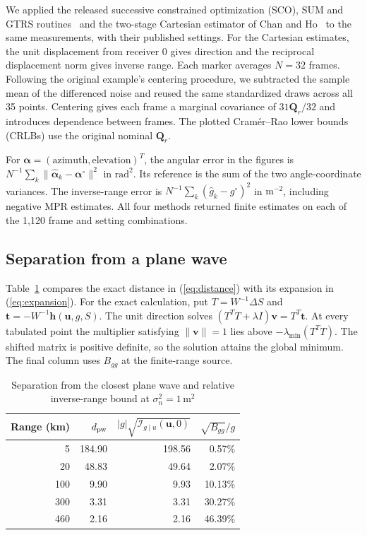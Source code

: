 \documentclass[journal]{IEEEtran}
\newcommand{\bu}{\mathbf{u}}
\newcommand{\bh}{\mathbf{h}}
\newcommand{\bQ}{\mathbf{Q}}
\begin{document}
We applied the released successive constrained optimization (SCO), SUM and GTRS routines~\cite{sunho2019,suniot2022,cispcode} and the two-stage Cartesian estimator of Chan and Ho~\cite{chanho1994,cispcode} to the same measurements, with their published settings. For the Cartesian estimates, the unit displacement from receiver 0 gives direction and the reciprocal displacement norm gives inverse range. Each marker averages \(N=32\) frames. Following the original example's centering procedure, we subtracted the sample mean of the differenced noise and reused the same standardized draws across all 35 points. Centering gives each frame a marginal covariance of \(31\bQ_r/32\) and introduces dependence between frames. The plotted Cramér--Rao lower bounds (CRLBs) use the original nominal \(\bQ_r\).

For \(\boldsymbol\alpha=(\mathrm{azimuth},\mathrm{elevation})^T\), the angular error in the figures is \(N^{-1}\sum_k\|\hat{\boldsymbol\alpha}_k-\boldsymbol\alpha^\circ\|^2\) in \(\mathrm{rad}^2\). Its reference is the sum of the two angle-coordinate variances. The inverse-range error is \(N^{-1}\sum_k(\hat g_k-g^\circ)^2\) in \(\mathrm{m}^{-2}\), including negative MPR estimates. All four methods returned finite estimates on each of the 1,120 frame and setting combinations.

\subsection{Separation from a plane wave}
Table~\ref{tab:distance} compares the exact distance in (\ref{eq:distance}) with its expansion in (\ref{eq:expansion}). For the exact calculation, put \(T=W^{-1}\Delta S\) and \(\mathbf t=-W^{-1}\bh(\bu,g,S)\). The unit direction solves \((T^TT+\lambda I)\mathbf v=T^T\mathbf t\). At every tabulated point the multiplier satisfying \(\|\mathbf v\|=1\) lies above \(-\lambda_{\min}(T^TT)\). The shifted matrix is positive definite, so the solution attains the global minimum. The final column uses \(B_{gg}\) at the finite-range source.

\begin{table}[!t]
\centering
\caption{Separation from the closest plane wave and relative inverse-range bound at \(\sigma_n^2=1\,\mathrm{m}^2\)}
\label{tab:distance}
\begin{tabular}{r r r r}
\toprule
Range (km) & \(d_{\rm pw}\) & \(|g|\sqrt{\mathcal I_{g\mid u}(\bu,0)}\) & \(\sqrt{B_{gg}}/g\) \\
\midrule
  5 & 184.90 & 198.56 &  0.57\% \\
 20 &  48.83 &  49.64 &  2.07\% \\
100 &   9.90 &   9.93 & 10.13\% \\
300 &   3.31 &   3.31 & 30.27\% \\
460 &   2.16 &   2.16 & 46.39\% \\
\bottomrule
\end{tabular}
\end{table}
\end{document}
